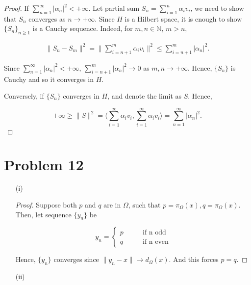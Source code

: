 \documentclass[12pt]{article}
\begin{document}
\begin{proof}

If $\sum_{n=1}^\infty |\alpha_n|^2 <+\infty $. Let partial sum $S_n = \sum_{i=1}^n \alpha_i v_i$, we need to show that $S_n$ converges as $n\rightarrow +\infty$. Since $H$ is a Hilbert space, it is enough to show $\{S_n\}_{n\geqslant 1}$ is a Cauchy sequence. Indeed, for $m, n \in \mathbb N$, $m > n$, 

$$
\begin{aligned}
\|S_n - S_m\|^2 = \|\sum_{i = n+1}^m \alpha_i v_i\|^2 \leqslant \sum_{i = n+1}^m |\alpha_n|^2.
\end{aligned}
$$

Since $\sum_{n=1}^\infty |\alpha_n|^2 <+\infty $, $\sum_{i = n+1}^m |\alpha_n|^2 \rightarrow 0$ as $m, n\rightarrow +\infty$. Hence, $\{S_n\}$ is Cauchy and so it converges in $H$.

Conversely, if $\{S_n\}$ converges in $H$, and denote the limit as $S$. Hence,  

$$
 +\infty \geqslant \|S\|^2 = \langle \sum_{i = 1}^\infty \alpha_i v_i, \sum_{i = 1}^\infty \alpha_i v_i \rangle = \sum_{n=1}^\infty |\alpha_n|^2.
$$

\end{proof}


\section*{Problem 12}

\begin{enumerate}
\item [(i)]

\begin{proof}

Suppose both $p$ and $q$ are in $\Omega$, such that $p = \pi_\Omega(x), q = \pi_\Omega(x)$. Then, let sequence $\{y_n\}$ be 

$$
y_n = \left\{
\begin{aligned}
p \qquad&  \text{if \ n \ odd}\\
q \qquad&  \text{if \ n \ even}
\end{aligned}\right.
$$

Hence, $\{y_n\}$ converges since $\|y_n - x\|\rightarrow d_\Omega(x)$. And this forces $p = q$.

\end{proof}

\item [(ii)]

\end{enumerate}
\end{document}
